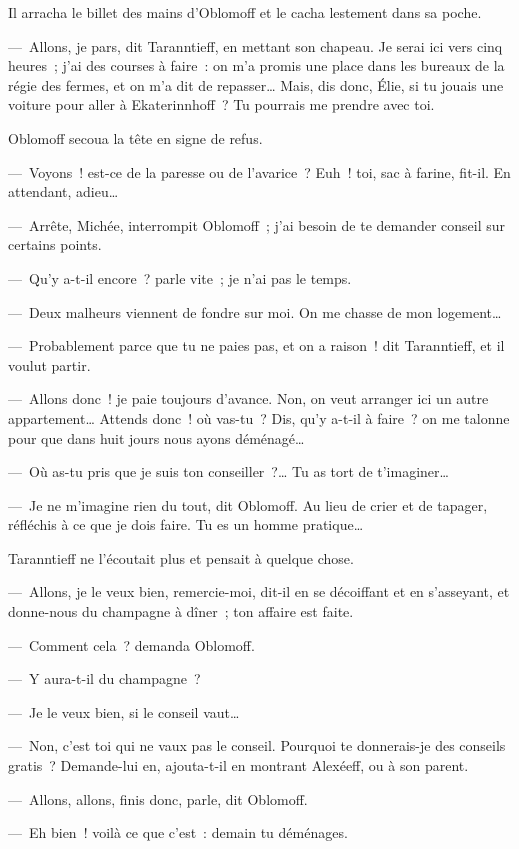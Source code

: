 \documentclass[french,twoside]{book} %
\begin{document}
Il arracha le billet des mains d’Oblomoff et le cacha lestement dans sa poche.\par
— Allons, je pars, dit Taranntieff, en mettant son chapeau. Je serai ici vers cinq heures ; j’ai des courses à faire : on m’a promis une place dans les bureaux de la régie des fermes, et on m’a dit de repasser… Mais, dis donc, Élie, si tu jouais une voiture pour aller à Ekaterinnhoff ? Tu pourrais me prendre avec toi.\par
Oblomoff secoua la tête en signe de refus.\par
— Voyons ! est-ce de la paresse ou de l’avarice ? Euh ! toi, sac à farine, fit-il. En attendant, adieu…\par
— Arrête, Michée, interrompit Oblomoff ; j’ai besoin de te demander conseil sur certains points.\par
— Qu’y a-t-il encore ? parle vite ; je n’ai pas le temps.\par
— Deux malheurs viennent de fondre sur moi. On me chasse de mon logement…\par
— Probablement parce que tu ne paies pas, et on a raison ! dit Taranntieff, et il voulut partir.\par
— Allons donc ! je paie toujours d’avance. Non, on veut arranger ici un autre appartement… Attends donc ! où vas-tu ? Dis, qu’y a-t-il à faire ? on me talonne pour que dans huit jours nous ayons déménagé…\par
— Où as-tu pris que je suis ton conseiller ?… Tu as tort de t’imaginer…\par
— Je ne m’imagine rien du tout, dit Oblomoff. Au lieu de crier et de tapager, réfléchis à ce que je dois faire. Tu es un homme pratique…\par
Taranntieff ne l’écoutait plus et pensait à quelque chose.\par
— Allons, je le veux bien, remercie-moi, dit-il en se décoiffant et en s’asseyant, et donne-nous du champagne à dîner ; ton affaire est faite.\par
— Comment cela ? demanda Oblomoff.\par
— Y aura-t-il du champagne ?\par
— Je le veux bien, si le conseil vaut…\par
— Non, c’est toi qui ne vaux pas le conseil. Pourquoi te donnerais-je des conseils gratis ? Demande-lui en, ajouta-t-il en montrant Alexéeff, ou à son parent.\par
— Allons, allons, finis donc, parle, dit Oblomoff.\par
— Eh bien ! voilà ce que c’est : demain tu déménages.\par
\end{document}
